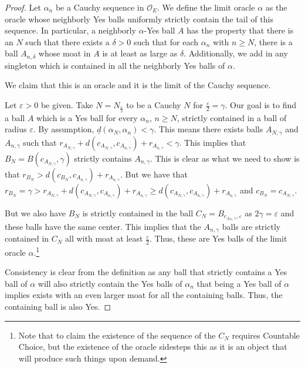 \documentclass[12pt]{article}
\begin{document}
\begin{proof}
     Let $\alpha_n$ be a Cauchy sequence in $\mathcal{O}_E$.  We define the limit oracle $\alpha$ as the oracle whose neighborly Yes balls uniformly strictly contain the tail of this sequence. In particular, a neighborly $\alpha$-Yes ball $A$ has the property that there is an $N$ such that there exists a $\delta > 0$ such that for each $\alpha_n$ with $n \geq N$, there is a ball $A_{n, \delta}$ whose moat in $A$ is at least as large as $\delta$. Additionally, we add in any singleton which is contained in all the neighborly Yes balls of $\alpha$.

     We claim that this is an oracle and it is the limit of the Cauchy sequence. 

    Let $\varepsilon > 0$ be given. Take $N = N_{\frac{\varepsilon}{2}}$ to be a Cauchy $N$ for $\frac{\varepsilon}{2} = \gamma$. Our goal is to find a ball $A$ which is a Yes ball for every $\alpha_n$, $n \geq N$, strictly contained in a ball of radius $\varepsilon$. By assumption, $\underline{d}(\alpha_N, \alpha_n) < \gamma$. This means there exists balls $A_{N,\gamma}$ and $A_{n, \gamma}$ such that $r_{A_{N, \gamma}} + d(c_{A_{N, \gamma}}, c_{A_{n, \gamma}}) + r_{A_{n,\gamma}} <\gamma$. This implies that $B_N = B(c_{A_{N, \gamma}}, \gamma)$ strictly contains $A_{n,\gamma}$. This is clear as what we need to show is that $r_{B_N} > d(c_{B_N}, c_{A_{n, \gamma}}) + r_{A_{n, \gamma}}$. But we have that $r_{B_N} = \gamma > r_{A_{N, \gamma}} + d(c_{A_{N, \gamma}}, c_{A_{n,\gamma}}) + r_{A_{n,\gamma}} \geq d(c_{A_{N, \gamma}}, c_{A_{n,\gamma}}) + r_{A_{n, \gamma}}$ and $c_{B_N} = c_{A_{N,\gamma}}$. 

    But we also have $B_N$ is strictly contained in the ball $C_N = B_{c_{A_N, \gamma}, \varepsilon}$ as $2 \gamma = \varepsilon$ and these balls have the same center. This implies that the $A_{n, \gamma}$ balls are strictly contained in $C_N$ all with moat at least $\frac{\varepsilon}{2}$. Thus, these are Yes balls of the limit oracle $\alpha$.\footnote{Note that to claim the existence of the sequence of the $C_N$ requires Countable Choice, but the existence of the oracle sidesteps this as it is an object that will produce such things upon demand.} 
    
    Consistency is clear from the definition as any ball that strictly contains a Yes ball of $\alpha$ will also strictly contain the Yes balls of $\alpha_n$ that being a Yes ball of $\alpha$ implies exists with an even larger moat for all the containing balls. Thus, the containing ball is also Yes. 
    

\end{proof}
\end{document}
